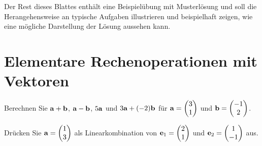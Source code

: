 \documentclass[11pt]{scrartcl}
\begin{document}
\sepline[.75\textwidth]

Der Rest dieses Blattes enthält eine Beispielübung mit Musterlösung und soll die Herangehensweise an typische Aufgaben illustrieren und beispielhaft zeigen, wie eine mögliche Darstellung der Lösung aussehen kann. 

\section{Elementare Rechenoperationen mit Vektoren}
\begin{subex}
  \item Berechnen Sie $\mathbf{a} + \mathbf{b}$, $\mathbf{a} - \mathbf{b}$, $5 \mathbf{a}$ und $3 \mathbf{a} + (-2) \mathbf{b}$ für $\mathbf{a} = \begin{pmatrix}3 \\ 1\end{pmatrix}$ und $\mathbf{b} = \begin{pmatrix} -1 \\ 2 \end{pmatrix}$.
  \item Drücken Sie $\mathbf{a} = \begin{pmatrix} 1 \\ 3 \end{pmatrix}$ als Linearkombination von $\mathbf{e}_1 = \begin{pmatrix} 2 \\ 1 \end{pmatrix}$ und $\mathbf{e}_2 = \begin{pmatrix} 1 \\ -1 \end{pmatrix}$ aus.
\end{subex}
\end{document}
